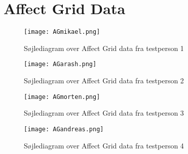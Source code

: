 \chapter{Affect Grid Data}\label{app:AG}
\begin{figure}[h]
\centering
\texttt{[image: AGmikael.png]}
\caption{Søjlediagram over Affect Grid data fra testperson 1}
\label{fig:AGMikael}
\end{figure}

\begin{figure}[h]
\centering
\texttt{[image: AGarash.png]}
\caption{Søjlediagram over Affect Grid data fra testperson 2}
\label{fig:AGArash}
\end{figure}

\begin{figure}[h]
\centering
\texttt{[image: AGmorten.png]}
\caption{Søjlediagram over Affect Grid data fra testperson 3}
\label{fig:AGMorten}
\end{figure}

\begin{figure}[h]
\centering
\texttt{[image: AGandreas.png]}
\caption{Søjlediagram over Affect Grid data fra testperson 4}
\label{fig:AGAndreas}
\end{figure}